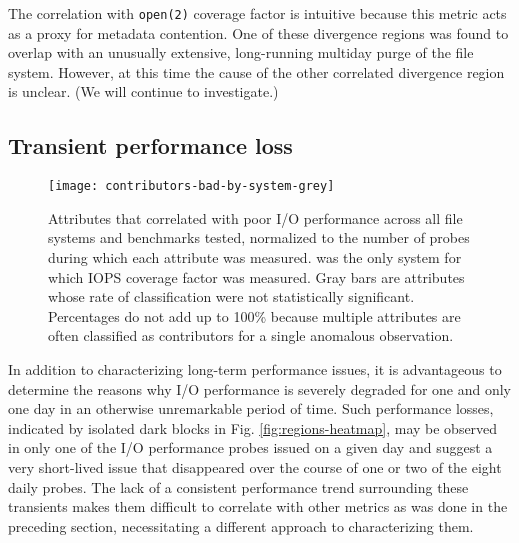 The correlation with
\texttt{open(2)} coverage factor is intuitive because this metric acts as a
proxy for metadata contention.  
One of these divergence regions was found to overlap with an unusually extensive, long-running multiday purge of the \edison \scratchtwo file system.
However,  at this time the cause of the other correlated divergence region is unclear. (We will continue to investigate.)


\subsection{Transient performance loss} \label{sec:results/shortterm}

\begin{figure}
    \centering
    \texttt{[image: contributors-bad-by-system-grey]}
    \vspace{-.35in}
    \caption{Attributes that correlated with poor I/O performance across all file systems and benchmarks tested, normalized to the number of probes during which each attribute was measured.
    \mira was the only system for which IOPS coverage factor was measured.
    Gray bars are attributes whose rate of classification were not statistically significant.
    Percentages do not add up to 100\% because multiple attributes are often classified as contributors for a single anomalous observation.
    }
    \label{fig:contributors-bad-by-system}
    \vspace{-.15in}
\end{figure}

In addition to characterizing long-term performance issues, it is  advantageous to determine the reasons why I/O performance is severely degraded for one and only one day in an otherwise unremarkable period of time.
Such performance losses, indicated by isolated dark blocks in Fig. \ref{fig:regions-heatmap}, may  be observed in only one of the I/O performance probes issued on a given day and suggest a very short-lived issue that disappeared over the course of one or two of the eight daily probes.
The lack of a consistent performance trend surrounding these transients makes them difficult to correlate with other metrics as was done in the preceding section, necessitating a different approach to characterizing them.

